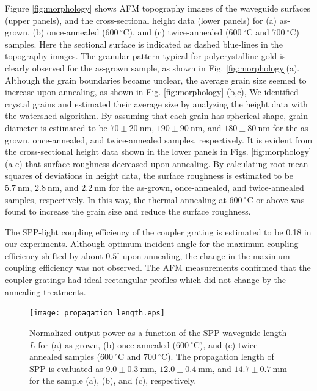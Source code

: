 \documentclass[aip,apl,reprint]{revtex4-1}
\begin{document}
Figure \ref{fig:morphology} shows AFM topography images of the waveguide surfaces (upper panels), and the cross-sectional height data (lower panels) for (a) as-grown, (b) once-annealed ($600\:^\circ\mathrm{C}$), and (c) twice-annealed ($600\:^\circ\mathrm{C}$ and $700\:^\circ\mathrm{C}$) samples. Here the sectional surface is indicated as dashed blue-lines in the topography images. The granular pattern typical for polycrystalline gold is clearly observed for the as-grown sample, as shown in Fig. \ref{fig:morphology}(a). Although the grain boundaries became unclear, the average grain size seemed to increase upon annealing, as shown in Fig. \ref{fig:morphology} (b,c),  We identified crystal grains and estimated their average size by analyzing the height data with the watershed algorithm\cite{Petr}. By assuming that each grain has spherical shape, grain diameter is estimated to be $70\pm20\:\mathrm{nm}$, $190\pm90\:\mathrm{nm}$, and $180\pm80\:\mathrm{nm}$ for the as-grown, once-annealed, and twice-annealed samples, respectively. It is evident from the cross-sectional height data shown in the lower panels in Figs. \ref{fig:morphology} (a-c) that surface roughness decreased upon annealing. By calculating root mean squares of deviations in height data, the surface roughness is estimated to be $5.7\:\mathrm{nm}$, $2.8\:\mathrm{nm}$, and $2.2\:\mathrm{nm}$ for the as-grown, once-annealed, and twice-annealed samples, respectively. In this way, the thermal annealing at $600\:^\circ\mathrm{C}$ or above was found to increase the grain size and reduce the surface roughness.

The SPP-light coupling efficiency of the coupler grating is estimated to be 0.18 in our experiments. Although optimum incident angle for the maximum coupling efficiency shifted by about $0.5^\circ$ upon annealing, the change in the maximum coupling efficiency was not observed. The AFM measurements confirmed that the coupler gratings had ideal rectangular profiles which did not change by the annealing treatments. 

 \begin{figure}
    \texttt{[image: propagation\_length.eps]}
    \caption{Normalized output power as a function of the SPP waveguide length $L$ for (a) as-grown, (b) once-annealed ($600\:^\circ\mathrm{C}$), and (c) twice-annealed samples ($600\:^\circ\mathrm{C}$ and $700\:^\circ\mathrm{C}$). The propagation length of SPP is evaluated as $9.0\pm0.3\:\mathrm{mm}$, $12.0\pm0.4\:\mathrm{mm}$, and $14.7\pm0.7\:\mathrm{mm}$ for the sample (a), (b), and (c), respectively.}
       \label{fig:propagation_length}
\end{figure}
\end{document}
